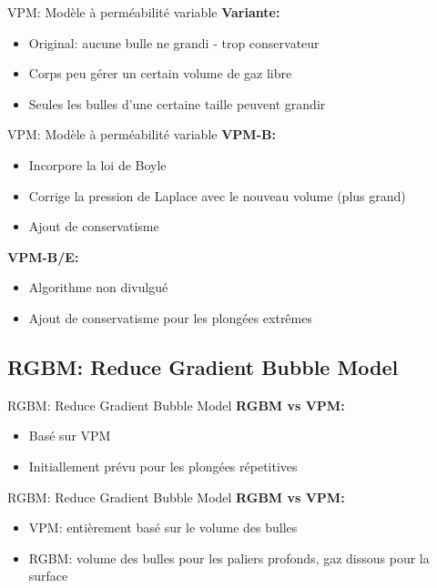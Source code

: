 \begin{frame}{VPM: Modèle à perméabilité variable}  
	\textbf{Variante:}
	\begin{itemize}
		\item Original: aucune bulle ne grandi - trop conservateur
		\item Corps peu gérer un certain volume de gaz libre
		\item Seules les bulles d'une certaine taille peuvent grandir
	\end{itemize}
\end{frame}

\begin{frame}{VPM: Modèle à perméabilité variable}
	\textbf{VPM-B:}
	\begin{itemize}
		\item Incorpore la loi de Boyle
		\item Corrige la pression de Laplace avec le nouveau volume (plus grand)
		\item Ajout de conservatisme
	\end{itemize}
	\vfill
	\textbf{VPM-B/E:}
	\begin{itemize}
		\item Algorithme non divulgué
		\item Ajout de conservatisme pour les plongées extrêmes
	\end{itemize}
\end{frame}
\subsection{RGBM: Reduce Gradient Bubble Model}

\begin{frame}{RGBM: Reduce Gradient Bubble Model}  
	\textbf{RGBM vs VPM:}
	\begin{itemize}
		\item Basé sur VPM
		\item Initiallement prévu pour les plongées répetitives
	\end{itemize}
\end{frame}

\begin{frame}{RGBM: Reduce Gradient Bubble Model}  
	\textbf{RGBM vs VPM:}
	\begin{itemize}
		\item VPM: entièrement basé sur le volume des bulles
		\item RGBM: volume des bulles pour les paliers profonds, gaz dissous pour la surface
	\end{itemize}
\end{frame}

